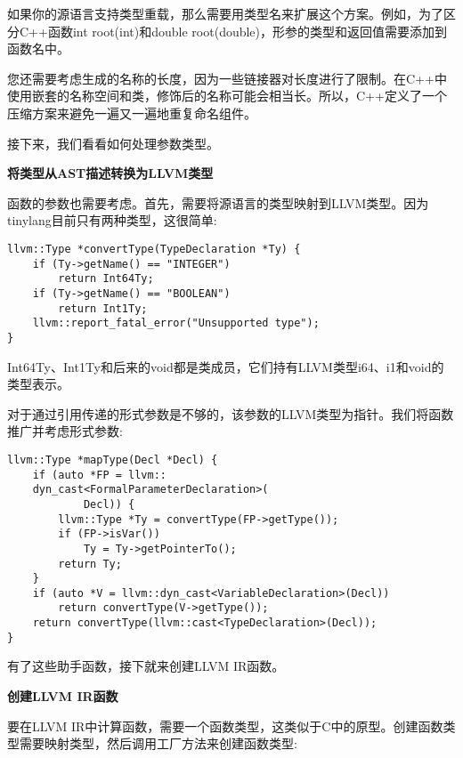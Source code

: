 如果你的源语言支持类型重载，那么需要用类型名来扩展这个方案。例如，为了区分C++函数int root(int)和double root(double)，形参的类型和返回值需要添加到函数名中。\par

您还需要考虑生成的名称的长度，因为一些链接器对长度进行了限制。在C++中使用嵌套的名称空间和类，修饰后的名称可能会相当长。所以，C++定义了一个压缩方案来避免一遍又一遍地重复命名组件。\par

接下来，我们看看如何处理参数类型。\par

\hspace*{\fill} \par %
\textbf{将类型从AST描述转换为LLVM类型}

函数的参数也需要考虑。首先，需要将源语言的类型映射到LLVM类型。因为tinylang目前只有两种类型，这很简单:\par

\begin{lstlisting}[caption={}]
llvm::Type *convertType(TypeDeclaration *Ty) {
	if (Ty->getName() == "INTEGER")
		return Int64Ty;
	if (Ty->getName() == "BOOLEAN")
		return Int1Ty;
	llvm::report_fatal_error("Unsupported type");
}
\end{lstlisting}

Int64Ty、Int1Ty和后来的void都是类成员，它们持有LLVM类型i64、i1和void的类型表示。\par

对于通过引用传递的形式参数是不够的，该参数的LLVM类型为指针。我们将函数推广并考虑形式参数:\par

\begin{lstlisting}[caption={}]
llvm::Type *mapType(Decl *Decl) {
	if (auto *FP = llvm::
	dyn_cast<FormalParameterDeclaration>(
			Decl)) {
		llvm::Type *Ty = convertType(FP->getType());
		if (FP->isVar())
			Ty = Ty->getPointerTo();
		return Ty;
	}
	if (auto *V = llvm::dyn_cast<VariableDeclaration>(Decl))
		return convertType(V->getType());
	return convertType(llvm::cast<TypeDeclaration>(Decl));
}
\end{lstlisting}

有了这些助手函数，接下就来创建LLVM IR函数。\par

\hspace*{\fill} \par %
\textbf{创建LLVM IR函数}

要在LLVM IR中计算函数，需要一个函数类型，这类似于C中的原型。创建函数类型需要映射类型，然后调用工厂方法来创建函数类型:\par


